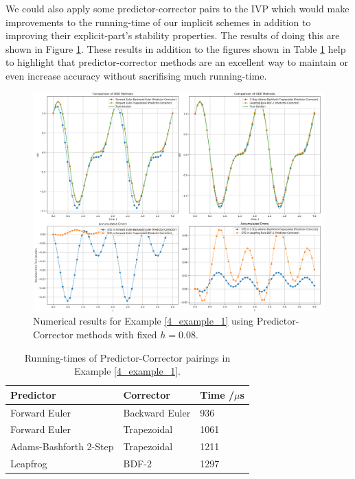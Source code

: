 \documentclass[12pt, twoside]{report}
\theoremstyle{plain}
\theoremstyle{definition}
\theoremstyle{definition}
\begin{document}
        We could also apply some predictor-corrector pairs to the IVP
        which would make improvements to the running-time of our implicit 
        schemes in addition to improving their explicit-part's stability 
        properties. The results of doing this are shown in Figure 
        \ref{4_pc_graphs_1}. These results in addition to the figures shown
        in Table \ref{4_pc_runtimes} help to highlight that 
        predictor-corrector methods are an excellent way to maintain or even
        increase accuracy without sacrifising much running-time.
        \begin{figure}[H]
            \centering
                \includegraphics[width=\columnwidth]{1_pc}
                \caption{Numerical results for Example \ref{4_example_1}
                using Predictor-Corrector methods with fixed $h=0.08$.}
                \label{4_pc_graphs_1}
        \end{figure}

        \begin{table}
            \centering
                \begin{tabular}[H]{| l | l | l |}
                    \hline
                    Predictor & Corrector & Time /$\mu$s \\ \hline
                    Forward Euler & Backward Euler & 936 \\ \hline
                    Forward Euler & Trapezoidal & 1061 \\ \hline
                    Adams-Bashforth 2-Step & Trapezoidal & 1211 \\ \hline
                    Leapfrog & BDF-2 & 1297 \\
                    \hline
                \end{tabular}
            \label{4_pc_runtimes}
            \caption{Running-times of Predictor-Corrector pairings in Example
            \ref{4_example_1}.}
        \end{table}
\end{document}
